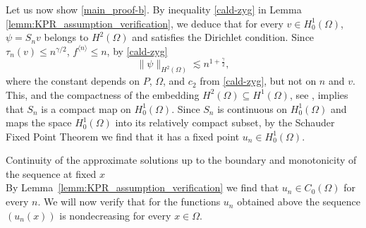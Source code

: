 \documentclass[12pt,a4paper]{amsart}
\makeatletter
\theoremstyle{definition}
\renewcommand{\subsubsection}{\@startsection{subsubsection}{3}%
    \z@{.5\linespacing\@plus.7\linespacing}{-.5em}%
    {\normalfont\bfseries}}
\makeatother
\begin{document}
Let us now show \ref{main_proof-b}.
By inequality \eqref{cald-zyg} in Lemma \ref{lemm:KPR_assumption_verification}, we deduce that for every $v\in H_0^1(\Omega)$, $\psi = S_n v$ belongs to $H^2(\Omega)$ and satisfies the Dirichlet condition.
Since $\tau_n(v)\le n^{\gamma/2}$, $f^{{\langle n \rangle}}\le n$, by \eqref{cald-zyg}
\begin{equation}\label{to-whole-space}
\| \psi\|_{H^2(\Omega)} \lesssim n^{1+\frac \gamma 2},   
\end{equation}
where the constant depends on $P$, $\Omega$, and $c_2$ from \eqref{cald-zyg}, but not on $n$ and $v$. This, and the compactness of the embedding $H^2(\Omega) \subseteq H^1(\Omega)$, see \cite[Theorem~5.7.1]{MR1625845}, implies that $S_n$ is a compact map on $H^1_0(\Omega)$. Since $S_n$ is continuous on $H^1_0(\Omega)$ and %
maps the space $H^1_0(\Omega)$ into its relatively compact subset, by the Schauder Fixed Point Theorem \cite[Corollary~11.2]{MR1814364} we find that it has a fixed point $u_n\in H^1_0(\Omega)$.

\bigskip
\noindent


\subsubsection{Continuity of the approximate solutions up to the boundary and monotonicity of the sequence at fixed $x$}~\\

By Lemma~\ref{lemm:KPR_assumption_verification} we find that $u_n\in C_0(\Omega)$ for every $n$.
We will now verify that for the functions $u_n$ obtained above the sequence
$(u_n(x))$ is nondecreasing for every $x\in \Omega$.
\end{document}
